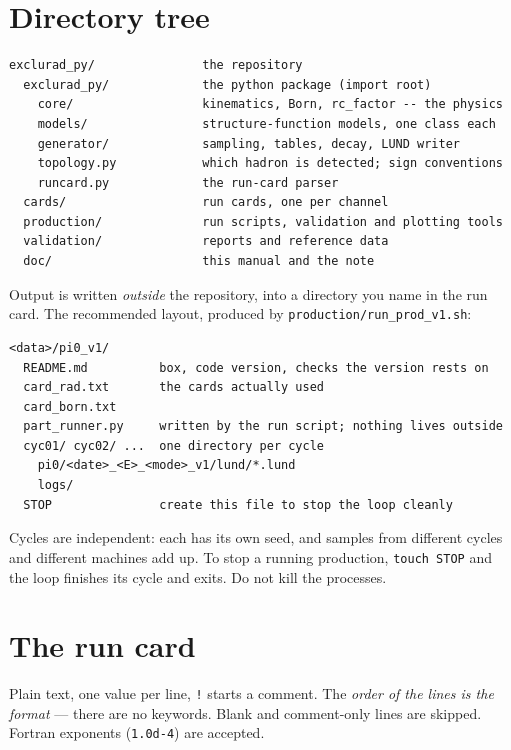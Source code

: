 \documentclass[11pt]{article}
\newcommand{\code}[1]{\texttt{#1}}
\begin{document}
\section{Directory tree}

\begin{lstlisting}
exclurad_py/               the repository
  exclurad_py/             the python package (import root)
    core/                  kinematics, Born, rc_factor -- the physics
    models/                structure-function models, one class each
    generator/             sampling, tables, decay, LUND writer
    topology.py            which hadron is detected; sign conventions
    runcard.py             the run-card parser
  cards/                   run cards, one per channel
  production/              run scripts, validation and plotting tools
  validation/              reports and reference data
  doc/                     this manual and the note
\end{lstlisting}

Output is written \emph{outside} the repository, into a directory you name in
the run card. The recommended layout, produced by
\code{production/run\_prod\_v1.sh}:

\begin{lstlisting}
<data>/pi0_v1/
  README.md          box, code version, checks the version rests on
  card_rad.txt       the cards actually used
  card_born.txt
  part_runner.py     written by the run script; nothing lives outside
  cyc01/ cyc02/ ...  one directory per cycle
    pi0/<date>_<E>_<mode>_v1/lund/*.lund
    logs/
  STOP               create this file to stop the loop cleanly
\end{lstlisting}

Cycles are independent: each has its own seed, and samples from different
cycles and different machines add up. To stop a running production,
\code{touch STOP} and the loop finishes its cycle and exits. Do not kill the
processes.

\section{The run card}

Plain text, one value per line, \code{!} starts a comment. The \emph{order of
the lines is the format} --- there are no keywords. Blank and comment-only
lines are skipped. Fortran exponents (\code{1.0d-4}) are accepted.
\end{document}
